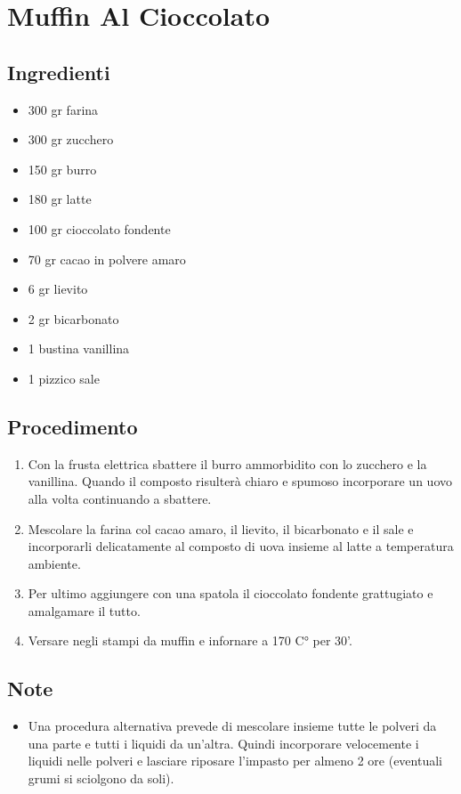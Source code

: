\section{Muffin Al Cioccolato}
\subsection{Ingredienti}
\begin{itemize}
\item 300 gr farina  
\item 300 gr zucchero  
\item 150 gr burro  
\item 180 gr latte  
\item 100 gr cioccolato fondente  
\item 70 gr cacao in polvere amaro  
\item 6 gr lievito  
\item 2 gr bicarbonato  
\item 1 bustina vanillina  
\item 1 pizzico sale
\end{itemize}
\subsection{Procedimento}
\begin{enumerate}
\item  Con la frusta elettrica sbattere il burro ammorbidito con lo zucchero e la vanillina. Quando il composto risulterà chiaro e spumoso incorporare un uovo alla volta continuando a sbattere.  
\item  Mescolare la farina col cacao amaro, il lievito, il bicarbonato e il sale e incorporarli delicatamente al composto di uova insieme al latte a temperatura ambiente.  
\item  Per ultimo aggiungere con una spatola il cioccolato fondente grattugiato e amalgamare il tutto.   
\item  Versare negli stampi da muffin e infornare a 170 C° per 30'.
\end{enumerate}
\subsection{Note}
\begin{itemize}
\item Una procedura alternativa prevede di mescolare insieme tutte le polveri da una parte e tutti i liquidi da un'altra. Quindi incorporare velocemente i liquidi nelle polveri e lasciare riposare l'impasto per almeno 2 ore (eventuali grumi si sciolgono da soli).
\end{itemize}

